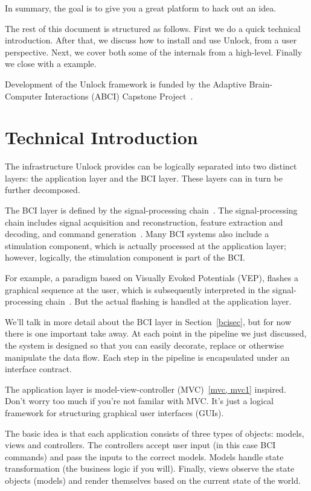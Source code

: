 \documentclass[11pt]{article}
\begin{document}
In summary, the goal is to give you a great platform to hack out an idea.

The rest of this document is structured as follows.  %
First we do a quick technical introduction.  After that, we discuss how to install and use Unlock, from a user perspective.  Next, we cover both some of the internals from a high-level.  Finally we close with a example.

Development of the Unlock framework is funded by the Adaptive Brain-Computer Interactions (ABCI) Capstone Project~\cite{abci}.

\section{Technical Introduction}

The infrastructure Unlock provides can be logically separated into two distinct layers: the application layer and the BCI layer.  These layers can in turn be further decomposed.

 The BCI layer is defined by the signal-processing chain~\cite{signalprocessing}.  The signal-processing chain includes signal acquisition and reconstruction, feature extraction and decoding, and command generation~\cite{neuraleng}.  Many BCI systems also include a stimulation component, which is actually processed at the application layer; however, logically, the stimulation component is part of the BCI.

For example, a paradigm based on Visually Evoked Potentials (VEP), flashes a graphical sequence at the user, which is subsequently interpreted in the signal-processing chain~\cite{vep}.  But the actual flashing is handled at the application layer.

We'll talk in more detail about the BCI layer in Section~\ref{bcisec}, but for now there is one important take away.  At each point in the pipeline we just discussed, the system is designed so that you can easily decorate, replace or otherwise manipulate the data flow.  Each step in the pipeline is encapsulated under an interface contract.

The application layer is model-view-controller (MVC)~\ref{mvc, mvc1} inspired.  Don't worry too much if you're not familar with MVC.  It's just a logical framework for structuring graphical user interfaces (GUIs).  

The basic idea is that each application consists of three types of objects: models, views and controllers.  The controllers accept user input (in this case BCI commands) and pass the inputs to the correct models.  Models handle state transformation (the business logic if you will).  Finally, views observe the state objects (models) and render themselves based on the current state of the world.
\end{document}
